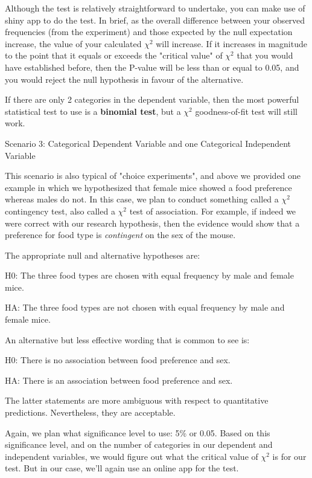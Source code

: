 \documentclass[
]{book}
\begin{document}
Although the test is relatively straightforward to undertake, you can make use of shiny app to do the test. In brief, as the overall difference between your observed frequencies (from the experiment) and those expected by the null expectation increase, the value of your calculated \(\chi{^2}\) will increase. If it increases in magnitude to the point that it equals or exceeds the "critical value" of \(\chi{^2}\) that you would have established before, then the P-value will be less than or equal to 0.05, and you would reject the null hypothesis in favour of the alternative.

If there are only 2 categories in the dependent variable, then the most powerful statistical test to use is a \textbf{binomial test}, but a \(\chi{^2}\) goodness-of-fit test will still work.

Scenario 3: Categorical Dependent Variable and one Categorical Independent Variable

This scenario is also typical of "choice experiments", and above we provided one example in which we hypothesized that female mice showed a food preference whereas males do not. In this case, we plan to conduct something called a \(\chi{^2}\) contingency test, also called a \(\chi{^2}\) test of association. For example, if indeed we were correct with our research hypothesis, then the evidence would show that a preference for food type is \emph{contingent} on the sex of the mouse.

The appropriate null and alternative hypotheses are:

H0: The three food types are chosen with equal frequency by male and female mice.

HA: The three food types are not chosen with equal frequency by male and female mice.

An alternative but less effective wording that is common to see is:

H0: There is no association between food preference and sex.

HA: There is an association between food preference and sex.

The latter statements are more ambiguous with respect to quantitative predictions. Nevertheless, they are acceptable.

Again, we plan what significance level to use: 5\% or 0.05. Based on this significance level, and on the number of categories in our dependent and independent variables, we would figure out what the critical value of \(\chi{^2}\) is for our test. But in our case, we'll again use an online app for the test.
\end{document}
